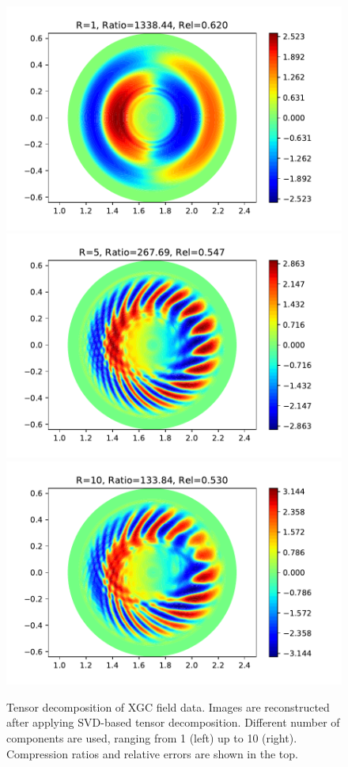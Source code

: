 \begin{figure}[!h]
  \centering
  \includegraphics[width=0.32\linewidth]{Figs/tensor-1.pdf}
  \includegraphics[width=0.32\linewidth]{Figs/tensor-5.pdf}
  \includegraphics[width=0.32\linewidth]{Figs/tensor-10.pdf}
  \caption{Tensor decomposition of XGC field data. Images are
    reconstructed after applying SVD-based tensor
    decomposition. Different number of components are used, ranging
    from 1 (left) up to 10 (right). Compression ratios and relative
    errors are shown in the top.}
  \label{fig:tensor-xgc}
\end{figure}


